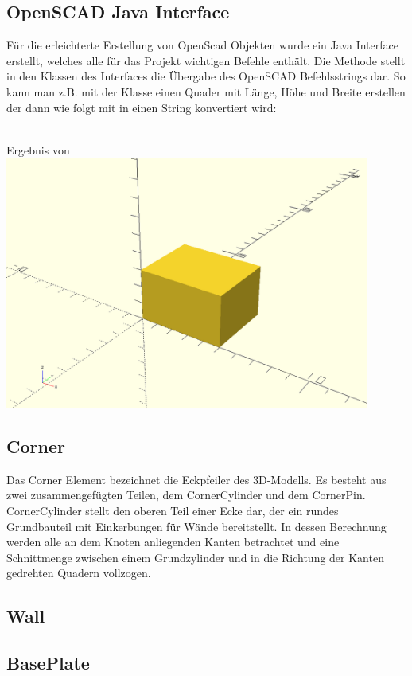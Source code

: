 \subsection{OpenSCAD Java Interface}
Für die erleichterte Erstellung von OpenScad Objekten wurde ein Java Interface  erstellt, welches alle für das Projekt wichtigen Befehle enthält.
Die Methode  stellt in den Klassen des Interfaces die Übergabe des OpenSCAD Befehlsstrings dar.
So kann man z.B. mit der Klasse  einen Quader mit Länge, Höhe und Breite erstellen der dann wie folgt mit  in einen String konvertiert wird:\\
\\
\begin{Bild}{Ergebnis von }
	\includegraphics[width = 120mm]{Bilder/Quader}
\end{Bild}



\subsection{Corner}
Das Corner Element bezeichnet die Eckpfeiler des 3D-Modells.
Es besteht aus zwei zusammengefügten Teilen, dem CornerCylinder und dem CornerPin.
CornerCylinder stellt den oberen Teil einer Ecke dar, der ein rundes Grundbauteil mit Einkerbungen für Wände bereitstellt.
In dessen Berechnung werden alle an dem Knoten anliegenden Kanten betrachtet und eine Schnittmenge zwischen einem Grundzylinder und in die Richtung der Kanten gedrehten Quadern vollzogen.\\
\subsection{Wall}
\subsection{BasePlate}